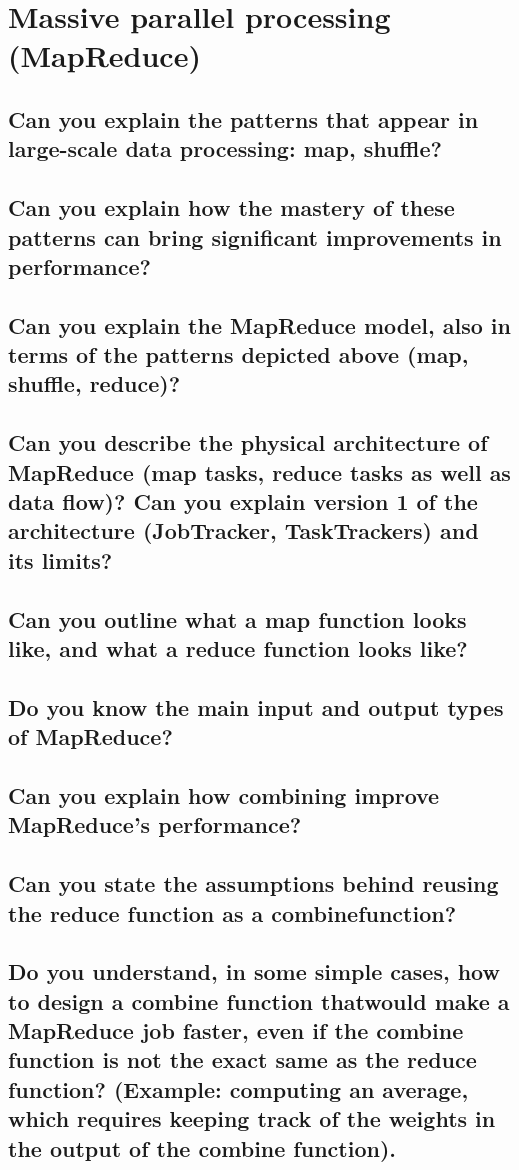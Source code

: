 \documentclass{article}
\begin{document}
\section{Massive parallel processing (MapReduce)}
\subsection{Can you explain the patterns that appear in large-scale data processing: map, shuffle?}
\subsection{Can you explain how the mastery of these patterns can bring significant improvements in performance?}
\subsection{Can you explain the MapReduce model, also in terms of the patterns depicted above (map, shuffle, reduce)?}
\subsection{Can you describe the physical architecture of MapReduce (map tasks, reduce tasks as well as data flow)? Can you explain version 1 of the architecture (JobTracker, TaskTrackers) and its limits?}
\subsection{Can you outline what a map function looks like, and what a reduce function looks like?}
\subsection{Do you know the main input and output types of MapReduce?}
\subsection{Can you explain how combining improve MapReduce's performance?}
\subsection{Can you state the assumptions behind reusing the reduce function as a combinefunction?}
\subsection{Do you understand, in some simple cases, how to design a combine function thatwould make a MapReduce job faster, even if the combine function is not the exact same as the reduce function? (Example: computing an average, which requires keeping track of the weights in the output of the combine function).}
\end{document}
